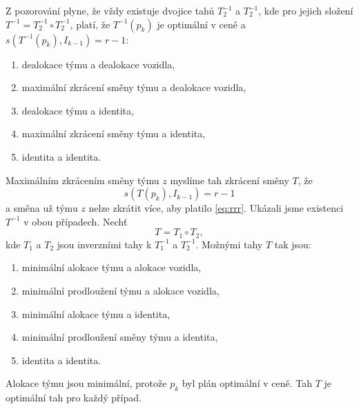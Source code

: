 \begin{dukaz}
  Z pozorování plyne, že vždy existuje dvojice tahů $T_2^{-1}$ a $T_2^{-1}$, kde pro jejich složení $T^{-1} = T_2^{-1} \circ T_2^{-1}$,
  platí, že $T^{-1}(p_k)$ je optimální v ceně a $s(T^{-1}(p_k), I_{k-1}) = r - 1$:
  \begin{enumerate}
  \item
    dealokace týmu a dealokace vozidla, 
  \item
    maximální zkrácení směny týmu a dealokace vozidla,
  \item
    dealokace týmu a identita,
  \item
    maximální zkrácení směny týmu a identita,
  \item
    identita a identita.
  \end{enumerate}
  Maximálním zkrácením směny týmu $z$ myslíme tah zkrácení směny $T$, že
  \begin{equation}\label{eq:rrr}
    s(T(p_k), I_{k-1}) = r - 1
  \end{equation}
  a směna už týmu $z$ nelze zkrátit více, aby platilo \ref{eq:rrr}.
  Ukázali jsme existenci $T^{-1}$ v obou případech. Nechť
  \begin{equation*}
    T = T_1 \circ T_2,
  \end{equation*}
  kde $T_1$ a $T_2$ jsou inverzními tahy k $T_1^{-1}$ a $T_2^{-1}$.
  Možnými tahy $T$ tak jsou:
  \begin{enumerate}
  \item
    minimální alokace týmu a alokace vozidla, 
  \item
    minimální prodloužení týmu a alokace vozidla,
  \item
    minimální alokace týmu a identita,
  \item
    minimální prodloužení směny týmu a identita,
  \item
    identita a identita.
  \end{enumerate}

  Alokace týmu jsou minimální, protože $p_k$ byl plán optimální v ceně.
  Tah $T$ je optimální tah pro každý případ.
\end{dukaz}

